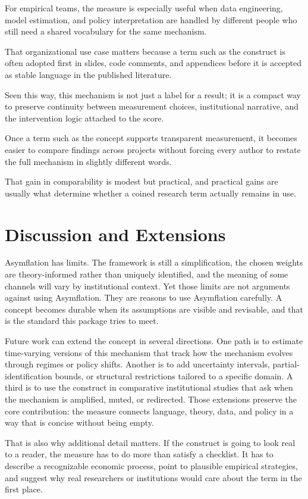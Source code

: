 \documentclass[12pt]{article}
\begin{document}
For empirical teams, the measure is especially useful when data engineering, model estimation, and policy interpretation are handled by different people who still need a shared vocabulary for the same mechanism.

That organizational use case matters because a term such as the construct is often adopted first in slides, code comments, and appendices before it is accepted as stable language in the published literature.

Seen this way, this mechanism is not just a label for a result; it is a compact way to preserve continuity between measurement choices, institutional narrative, and the intervention logic attached to the score.

Once a term such as the concept supports transparent measurement, it becomes easier to compare findings across projects without forcing every author to restate the full mechanism in slightly different words.

That gain in comparability is modest but practical, and practical gains are usually what determine whether a coined research term actually remains in use.

\section{Discussion and Extensions}
Asymflation has limits. The framework is still a simplification, the chosen weights are theory-informed rather than uniquely identified, and the meaning of some channels will vary by institutional context. Yet those limits are not arguments against using Asymflation. They are reasons to use Asymflation carefully. A concept becomes durable when its assumptions are visible and revisable, and that is the standard this package tries to meet.

Future work can extend the concept in several directions. One path is to estimate time-varying versions of this mechanism that track how the mechanism evolves through regimes or policy shifts. Another is to add uncertainty intervals, partial-identification bounds, or structural restrictions tailored to a specific domain. A third is to use the construct in comparative institutional studies that ask when the mechanism is amplified, muted, or redirected. Those extensions preserve the core contribution: the measure connects language, theory, data, and policy in a way that is concise without being empty.

That is also why additional detail matters. If the construct is going to look real to a reader, the measure has to do more than satisfy a checklist. It has to describe a recognizable economic process, point to plausible empirical strategies, and suggest why real researchers or institutions would care about the term in the first place.
\end{document}
